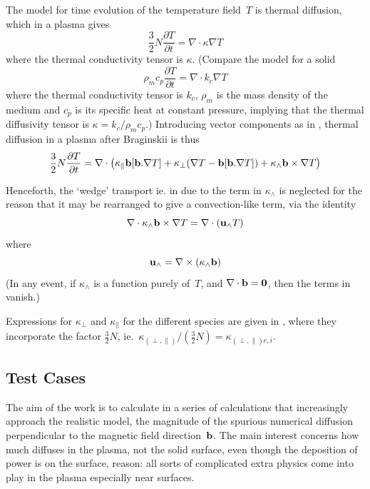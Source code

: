 The model for time evolution of the temperature field~$T$ is thermal diffusion,
which in a plasma gives
\begin{equation}\label{eq:plas2diff}
\frac{3}{2} N \frac{\partial T}{\partial t}=\nabla \cdot \kappa \nabla T
\end{equation}
where the thermal conductivity tensor is $\kappa$.
(Compare the model for a solid
\begin{equation}\label{eq:solidiff}
\rho_m c_p \frac{\partial T}{\partial t}=\nabla \cdot k_c \nabla T
\end{equation}
where the thermal conductivity tensor is $k_c$, $\rho_m$ is the mass density of the medium 
and $c_p$ is its specific heat at constant pressure, implying
that the thermal diffusivity tensor is $\kappa=k_c/\rho_m c_p$.)
Introducing vector components as  in ,
thermal diffusion in a plasma after Braginskii is thus
\begin{equation}\label{eq:plas2brag}
\frac{3}{2} N \frac{\partial T}{\partial t}=
\nabla \cdot \left(
\kappa_{\parallel} {\bf b} [{\bf b}.\nabla T] +
\kappa_{\perp} (\nabla T - {\bf b} [{\bf b}.\nabla T])+
\kappa_{\wedge} {\bf b} \times \nabla T
\right) 
\end{equation}

Henceforth, the `wedge' transport ie. in due to the term in $\kappa_{\wedge}$
is neglected for the reason that it may be rearranged to give
a convection-like term, via the identity 
\begin{equation}\label{eq:crossxp}
\nabla \cdot \kappa_\wedge {\bf b} \times \nabla T = \nabla \cdot ({\bf u}_\wedge  T)
\end{equation}
where
\begin{equation}\label{eq:uxp}
{\bf u}_\wedge = \nabla \times (\kappa_\wedge {\bf b})
\end{equation}
(In any event, if $\kappa_\wedge$ is a function purely of~$T$, and
$\nabla \cdot {\bf b}=\bf{0}$, then the terms in  vanish.)

Expressions for $\kappa_{\perp}$ and $\kappa_{\parallel}$ for the different species
are given in , where they incorporate  the factor $\frac{3}{2} N$,
ie.\ $\kappa_{(\perp, \parallel)}/(\frac{3}{2} N) = \kappa_{(\perp , \parallel) e,i}$.

\subsection{Test Cases}\label{sec:tests}
The aim of the work is to calculate in a series of calculations that increasingly
approach the realistic model, the magnitude of the spurious numerical diffusion
perpendicular to the magnetic field direction~${\bf b}$. The main interest concerns
how much diffuses in the plasma, not the solid surface, even though the deposition
of power is on the surface, reason: all sorts of complicated extra physics come
into play in the plasma especially near surfaces.

